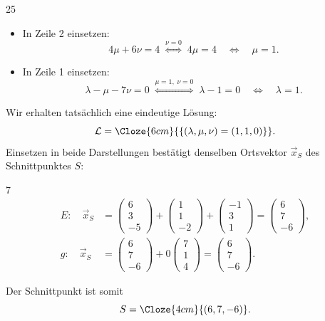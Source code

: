 \begin{tcolorbox}[
  scriptbox,
  breakable=false,
  borderline west={1.2pt}{0pt}{black!40},
  title={Beispiel~\ref{ex:analytic_geometry_line_plane_intersection_example} -- Fortsetzung}
]
\begin{ClozeArea}[34]{25}
\begin{itemize}[leftmargin=1.6em,itemsep=0.25em,topsep=0.2em]
        \[
          -66\nu=0
          \quad\Longleftrightarrow\quad
          \nu=0.
        \]
      \item In Zeile 2 einsetzen:
        \[
          4\mu+6\nu=4
          \;\overset{\nu=0}{\Longleftrightarrow}\;
          4\mu=4
          \quad\Longleftrightarrow\quad
          \mu=1.
        \]
      \item In Zeile 1 einsetzen:
        \[
          \lambda-\mu-7\nu=0
          \;\overset{\mu=1,\;\nu=0}{\Longleftrightarrow}\;
          \lambda-1=0
          \quad\Longleftrightarrow\quad
          \lambda=1.
        \]
    \end{itemize}
  \end{ClozeArea}
  Wir erhalten tatsächlich eine eindeutige Lösung:
  \[
    \mathcal L=\Cloze{6cm}{\{(\lambda,\mu,\nu)=(1,1,0)\}}.
  \]
  Einsetzen in beide Darstellungen bestätigt denselben Ortsvektor 
  $\vec{x}_S$ des Schnittpunktes $S$:
  \begin{ClozeArea}[34]{7}
    \[
      \begin{aligned}
        E:\quad
        \vec{x}_S
          &=\begin{pmatrix}6\\3\\-5\end{pmatrix}
            +\begin{pmatrix}1\\1\\-2\end{pmatrix}
            +\begin{pmatrix}-1\\3\\1\end{pmatrix}
            =\begin{pmatrix}6\\7\\-6\end{pmatrix},\\[1em]
        g:\quad
        \vec{x}_S
          &=\begin{pmatrix}6\\7\\-6\end{pmatrix}
            +0\begin{pmatrix}7\\1\\4\end{pmatrix}
            =\begin{pmatrix}6\\7\\-6\end{pmatrix}.
      \end{aligned}
    \]
  \end{ClozeArea}
  Der Schnittpunkt ist somit
  \[
    S=\Cloze{4cm}{(6,7,-6)}.
  \]
\end{tcolorbox}
